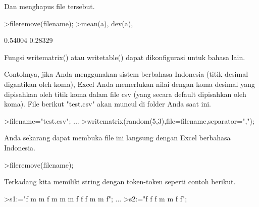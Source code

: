 \documentclass[12pt,arial,letterpaper]{book}
\begin{document}
\begin{eulercomment}
\begin{eulercomment}
\begin{eulercomment}
\begin{eulercomment}
\begin{eulercomment}
\begin{eulercomment}
\begin{eulercomment}
\begin{eulercomment}
\begin{eulercomment}
\begin{eulercomment}
\begin{eulercomment}
\begin{eulercomment}
\begin{eulercomment}
\begin{eulercomment}
\begin{eulercomment}
\begin{eulercomment}
\begin{eulercomment}
\begin{eulercomment}
\begin{eulercomment}
\begin{eulercomment}
\begin{eulercomment}
\begin{eulercomment}
\begin{eulercomment}
\begin{eulercomment}
\begin{eulercomment}
\begin{eulercomment}
\begin{eulercomment}
\begin{eulercomment}
\begin{eulercomment}
\begin{eulercomment}
\begin{eulercomment}
\begin{eulercomment}
\begin{eulercomment}
\begin{eulercomment}
\begin{eulercomment}
\begin{eulercomment}
\begin{eulercomment}
\begin{eulercomment}
\begin{eulercomment}
Dan menghapus file tersebut.
\end{eulercomment}
\begin{eulerprompt}
>fileremove(filename);
>mean(a), dev(a),
\end{eulerprompt}
\begin{euleroutput}
  0.54004
  0.28329
\end{euleroutput}
\begin{eulercomment}
Fungsi writematrix() atau writetable() dapat dikonfigurasi untuk
bahasa lain.

Contohnya, jika Anda menggunakan sistem berbahasa Indonesia (titik
desimal digantikan oleh koma), Excel Anda memerlukan nilai dengan koma
desimal yang dipisahkan oleh titik koma dalam file csv (yang secara
default dipisahkan oleh koma). File berikut "test.csv" akan muncul di
folder Anda saat ini.
\end{eulercomment}
\begin{eulerprompt}
>filename="test.csv"; ...
>writematrix(random(5,3),file=filename,separator=",");
\end{eulerprompt}
\begin{eulercomment}
Anda sekarang dapat membuka file ini langsung dengan Excel berbahasa
Indonesia.
\end{eulercomment}
\begin{eulerprompt}
>fileremove(filename);
\end{eulerprompt}
\begin{eulercomment}
Terkadang kita memiliki string dengan token-token seperti contoh
berikut.
\end{eulercomment}
\begin{eulerprompt}
>s1:="f m m f m m m f f f m m f";  ...
>s2:="f f f m m f f";

\end{eulerprompt}
\end{eulercomment}
\end{eulercomment}
\end{eulercomment}
\end{eulercomment}
\end{eulercomment}
\end{eulercomment}
\end{eulercomment}
\end{eulercomment}
\end{eulercomment}
\end{eulercomment}
\end{eulercomment}
\end{eulercomment}
\end{eulercomment}
\end{eulercomment}
\end{eulercomment}
\end{eulercomment}
\end{eulercomment}
\end{eulercomment}
\end{eulercomment}
\end{eulercomment}
\end{eulercomment}
\end{eulercomment}
\end{eulercomment}
\end{eulercomment}
\end{eulercomment}
\end{eulercomment}
\end{eulercomment}
\end{eulercomment}
\end{eulercomment}
\end{eulercomment}
\end{eulercomment}
\end{eulercomment}
\end{eulercomment}
\end{eulercomment}
\end{eulercomment}
\end{eulercomment}
\end{eulercomment}
\end{eulercomment}
\end{document}
